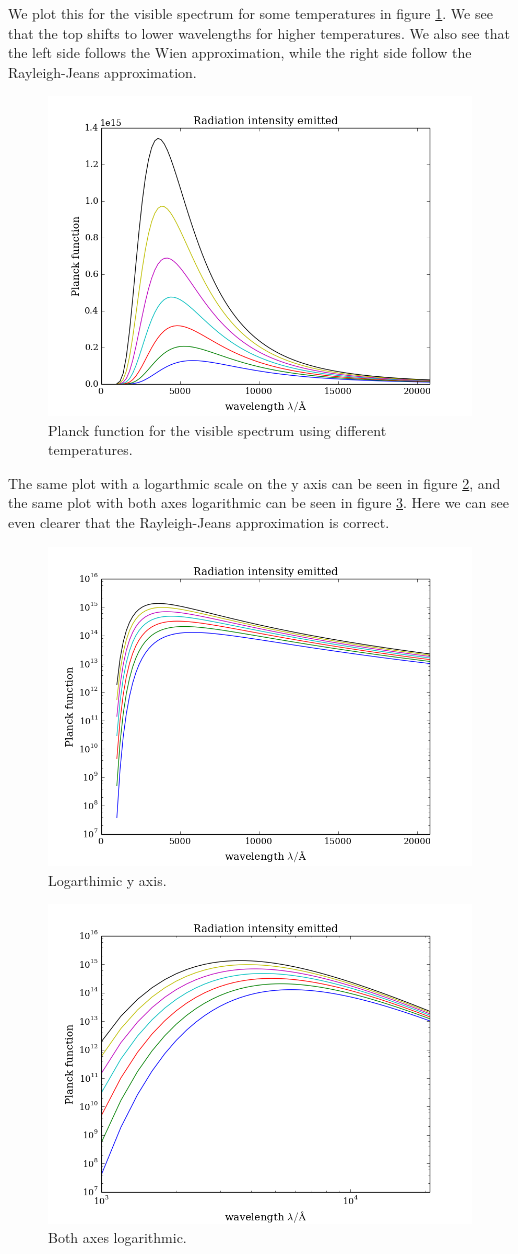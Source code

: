\documentclass{aa}   %
\begin{document}
We plot this for the visible spectrum for some temperatures in figure \ref{radiation}. We see that the top shifts to lower wavelengths for higher temperatures. We also see that the left side follows the Wien approximation, while the right side follow the Rayleigh-Jeans approximation.
\begin{figure}
 \includegraphics[width=.49\textwidth]{radiation.png}
 \caption{Planck function for the visible spectrum using different temperatures.}
 \label{radiation}
\end{figure}
The same plot with a logarthmic scale on the y axis can be seen in figure \ref{radiation_ylog}, and the same plot with both axes logarithmic can be seen in figure \ref{radiation_ylog_xlog}. Here we can see even clearer that the Rayleigh-Jeans approximation is correct.
\begin{figure}
 \includegraphics[width=.49\textwidth]{radiation_ylog.png}
 \caption{Logarthimic y axis.}
 \label{radiation_ylog}
\end{figure}
\begin{figure}
 \includegraphics[width=.49\textwidth]{radiation_ylog_xlog.png}
 \caption{Both axes logarithmic.}
 \label{radiation_ylog_xlog}
\end{figure}
\end{document}
